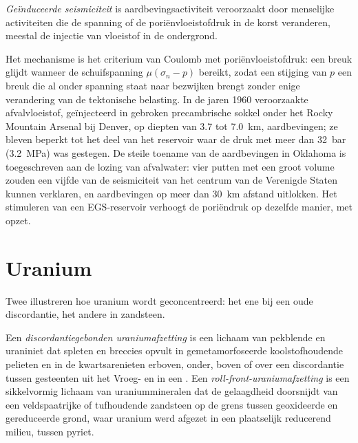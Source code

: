\begin{definition}\label{def:b2:energy-geology:induced}
\emph{Geïnduceerde seismiciteit} is aardbevingsactiviteit veroorzaakt door menselijke
activiteiten die de spanning of de poriënvloeistofdruk in de korst veranderen, meestal de
injectie van vloeistof in de ondergrond.
\end{definition}

Het mechanisme is het criterium van Coulomb met poriënvloeistofdruk: een breuk glijdt wanneer de schuifspanning
$\mu(\sigma_n - p)$ bereikt, zodat een stijging van $p$ een breuk die al onder spanning staat naar bezwijken brengt
zonder enige verandering van de tektonische belasting. In de jaren 1960 veroorzaakte afvalvloeistof, geïnjecteerd in gebroken
precambrische sokkel onder het Rocky Mountain Arsenal bij Denver, op diepten van 3.7 tot
\qty{7.0}{km}, aardbevingen; ze bleven beperkt tot het deel van het reservoir waar de
druk met meer dan \qty{32}{bar} (\qty{3.2}{MPa}) was gestegen. De steile toename van de aardbevingen
in Oklahoma is toegeschreven aan de lozing van afvalwater: vier putten met een groot volume
zouden een vijfde van de seismiciteit van het centrum van de Verenigde Staten kunnen verklaren, en
aardbevingen op meer dan \qty{30}{km} afstand uitlokken. Het stimuleren van een EGS-reservoir verhoogt de poriëndruk op
dezelfde manier, met opzet.

\section{Uranium}\label{sec:b2:energy-geology:uranium}

Twee  illustreren hoe uranium wordt geconcentreerd: het ene bij een oude discordantie, het
andere in zandsteen.

\begin{definition}\label{def:b2:energy-geology:uranium}
Een \emph{discordantiegebonden uraniumafzetting} is een lichaam
van pekblende en uraniniet dat spleten en breccies opvult in gemetamorfoseerde koolstofhoudende pelieten en
in de kwartsarenieten erboven, onder, boven of over een discordantie tussen gesteenten uit het Vroeg- en
 in een . Een \emph{roll-front-uraniumafzetting}
is een sikkelvormig lichaam van uraniummineralen dat de gelaagdheid doorsnijdt van een
veldspaatrijke of tufhoudende zandsteen op de grens tussen geoxideerde en gereduceerde grond, waar
uranium werd afgezet in een plaatselijk reducerend milieu, tussen pyriet.
\end{definition}

